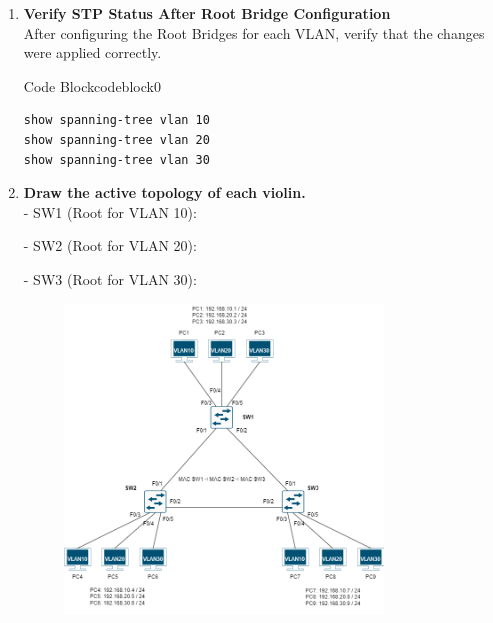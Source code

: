 \documentclass[a4paper]{book}
\begin{document}
\begin{enumerate}
	      \begin{ocg}{Code Block}{codeblock}{0}
		      \vspace{0.5cm}
		      \begin{lstlisting}
spanning-tree vlan 30 priority 4096
\end{lstlisting}

	      \end{ocg}

	      \textit{Note:} A lower priority value increases the likelihood of a switch becoming the Root Bridge. The default is 32768.

	\item \textbf{Verify STP Status After Root Bridge Configuration} \\
	      After configuring the Root Bridges for each VLAN, verify that the changes were applied correctly.



	      \begin{ocg}{Code Block}{codeblock}{0}
		      \vspace{0.5cm}
		      \begin{lstlisting}
show spanning-tree vlan 10
show spanning-tree vlan 20
show spanning-tree vlan 30
\end{lstlisting}

	      \end{ocg}

	      \newpage
	\item \textbf{Draw the active topology of each violin.} \\
	      - SW1 (Root for VLAN 10):


	      - SW2 (Root for VLAN 20):


	      - SW3 (Root for VLAN 30):
	      \begin{figure}[h]
		      \centering
		      \includegraphics[width=0.8\textwidth]{img/pvst01.png}
		      \caption{\textit{}}
	      \end{figure}
\end{enumerate}
\end{document}
